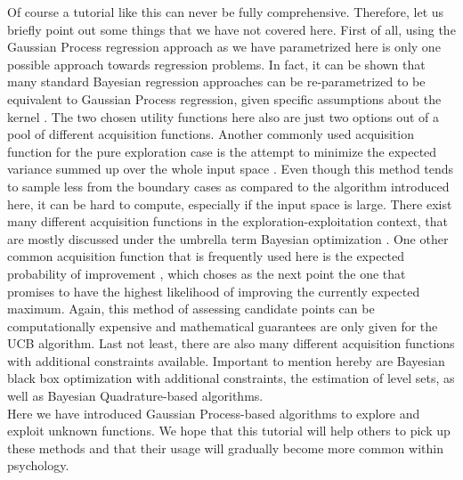 \documentclass[authoryear,11pt,review]{elsarticle}
\begin{document}
Of course a tutorial like this can never be fully comprehensive. Therefore, let us briefly point out some things that we have not covered here. First of all, using the Gaussian Process regression approach as we have parametrized here is only one possible approach towards regression problems. In fact, it can be shown that many standard Bayesian regression approaches can be re-parametrized to be equivalent to Gaussian Process regression, given specific assumptions about the kernel \citep{duvenaud2013structure}. The two chosen utility functions here also are just two options out of a pool of different acquisition functions. Another commonly used acquisition function for the pure exploration case is the attempt to minimize the expected variance summed up over the whole input space \citep{gramacy2014local}. Even though this method tends to sample less from the boundary cases as compared to the algorithm introduced here, it can be hard to compute, especially if the input space is large. There exist many different acquisition functions in the exploration-exploitation context, that are mostly discussed under the umbrella term Bayesian optimization \citep{de2012regret}. One other common acquisition function that is frequently used here is the expected probability of improvement \citep{mockus2012bayesian}, which choses as the next point the one that promises to have the highest likelihood of improving the currently expected maximum.  Again, this method of assessing candidate points can be computationally expensive and mathematical guarantees are only given for the UCB algorithm. Last not least, there are also many different acquisition functions with additional constraints available. Important to mention hereby are Bayesian black box optimization with additional constraints, the estimation of level sets, as well as Bayesian Quadrature-based algorithms. \\

Here we have introduced Gaussian Process-based algorithms to explore and exploit unknown functions. We hope that this tutorial will help others to pick up these methods and that their usage will gradually become more common within psychology.

\end{document}

